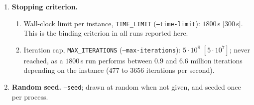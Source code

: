 \begin{enumerate}
  \item \textbf{Stopping criterion.}
        \begin{enumerate}
          \item Wall-clock limit per instance, \texttt{TIME\_LIMIT}
                (\texttt{--time-limit}): $1800$\,s $[300$\,s$]$. This is the
                binding criterion in all runs reported here.
          \item Iteration cap, \texttt{MAX\_ITERATIONS}
                (\texttt{--max-iterations}): $5\cdot 10^{8}$
                $[5\cdot 10^{7}]$; never reached, as a $1800$\,s run performs
                between $0.9$ and $6.6$ million iterations depending on the
                instance ($477$ to $3656$ iterations per second).
        \end{enumerate}

  \item \textbf{Random seed.}
        \texttt{--seed}; drawn at random when not given, and seeded once per
        process.

\end{enumerate}
